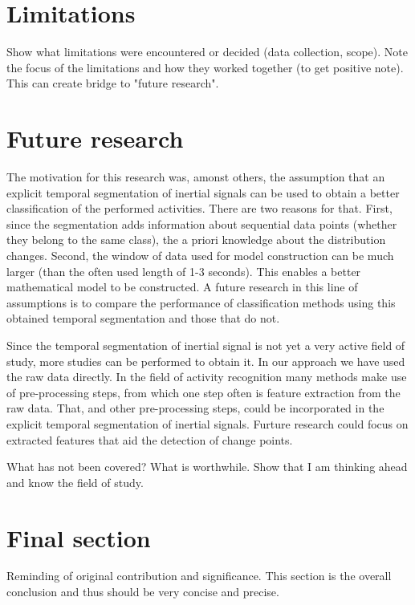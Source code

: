 \section{Limitations}
Show what limitations were encountered or decided (data collection, scope).
Note the focus of the limitations and how they worked together (to get positive note).
This can create bridge to "future research".

\section{Future research}
The motivation for this research was, amonst others, the assumption that an explicit temporal segmentation of inertial signals can be used to obtain a better classification of the performed activities.
There are two reasons for that.
First, since the segmentation adds information about sequential data points (whether they belong to the same class), the a priori knowledge about the distribution changes.
Second, the window of data used for model construction can be much larger (than the often used length of 1-3 seconds).
This enables a better mathematical model to be constructed.
A future research in this line of assumptions is to compare the performance of classification methods using this obtained temporal segmentation and those that do not.

Since the temporal segmentation of inertial signal is not yet a very active field of study, more studies can be performed to obtain it.
In our approach we have used the raw data directly.
In the field of activity recognition many methods make use of pre-processing steps, from which one step often is feature extraction from the raw data.
That, and other pre-processing steps, could be incorporated in the explicit temporal segmentation of inertial signals.
Furture research could focus on extracted features that aid the detection of change points.



What has not been covered? What is worthwhile.
Show that I am thinking ahead and know the field of study.



\section{Final section}
Reminding of original contribution and significance.
This section is the overall conclusion and thus should be very concise and precise.

